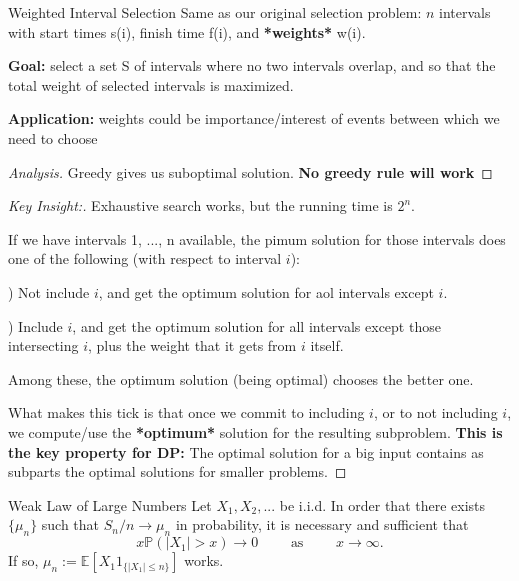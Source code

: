 \documentclass[openany]{article}
\begin{document}
\begin{problem*}{Weighted Interval Selection}
    Same as our original selection problem:
    $n$ intervals with start times s(i), finish time f(i), and \textbf{*weights*} w(i).

    \textbf{Goal:} select a set S of intervals where no two intervals overlap, and so that the total weight of selected intervals is maximized.

    \textbf{Application:} weights could be importance/interest of events between which we need to choose
\end{problem*}

\begin{proof}[Analysis]{}
		\renewcommand{\qedsymbol}{} %
        Greedy gives us suboptimal solution. \textbf{No greedy rule will work}
\end{proof}
\begin{proof}[Key Insight:]{}
		\renewcommand{\qedsymbol}{} %
        Exhaustive search works, but the running time is $2^n$. 

        If we have intervals 1, ..., n available, the pimum solution for those intervals does one of the following (with respect to interval $i$):

        ) Not include $i$, and get the optimum solution for aol intervals except $i$.
        
        ) Include $i$, and get the optimum solution for all intervals except those intersecting $i$, plus the weight that it gets from $i$ itself.

        \qquad Among these, the optimum solution (being optimal) chooses the better one.

        What makes this tick is that once we commit to including $i$, or to not including $i$, we compute/use the \textbf{*optimum*} solution for the resulting subproblem. \textbf{This is the key property for DP:} The optimal solution for a big input contains as subparts the optimal solutions for smaller problems.
\end{proof}





\begin{theorem*}{Weak Law of Large Numbers}{}
		Let $X_1,X_2,...$ be i.i.d. In order that there exists $\{\mu_n\}$ such that $S_n /n\to \mu_n$ in probability, it is necessary and sufficient that
		\[
				x \mathbb{P}(\lvert X_1\rvert >x) \to 0 \qquad \text{ as }\qquad x\to \infty.
		\] 
		If so, $\mu_n:= \mathbb{E}[X_1 1_{\{\lvert X_1\rvert \leqslant n\}}]$ works.
\end{theorem*}
\end{document}
